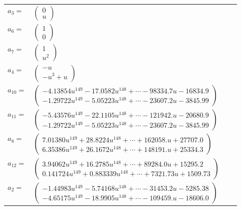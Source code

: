 \documentclass[1p]{elsarticle_modified}
\theoremstyle{definition}
\begin{document}
\begin{tabular}{m{7pt} m{180pt} m{7pt} m{180pt} }
\flushright $a_{3}=$&$\begin{pmatrix}0\\u\end{pmatrix}$ \\
\flushright $a_{6}=$&$\begin{pmatrix}1\\0\end{pmatrix}$ \\
\flushright $a_{7}=$&$\begin{pmatrix}1\\u^2\end{pmatrix}$ \\
\flushright $a_{4}=$&$\begin{pmatrix}- u\\- u^3+u\end{pmatrix}$ \\
\flushright $a_{10}=$&$\begin{pmatrix}-4.13854 u^{149}-17.0582 u^{148}+\cdots-98334.7 u-16834.9\\-1.29722 u^{149}-5.05223 u^{148}+\cdots-23607.2 u-3845.99\end{pmatrix}$ \\
\flushright $a_{11}=$&$\begin{pmatrix}-5.43576 u^{149}-22.1105 u^{148}+\cdots-121942. u-20680.9\\-1.29722 u^{149}-5.05223 u^{148}+\cdots-23607.2 u-3845.99\end{pmatrix}$ \\
\flushright $a_{8}=$&$\begin{pmatrix}7.01380 u^{149}+28.8224 u^{148}+\cdots+162058. u+27707.0\\6.35386 u^{149}+26.1672 u^{148}+\cdots+148191. u+25334.3\end{pmatrix}$ \\
\flushright $a_{12}=$&$\begin{pmatrix}3.94062 u^{149}+16.2785 u^{148}+\cdots+89284.0 u+15295.2\\0.141724 u^{149}+0.883339 u^{148}+\cdots+7321.73 u+1509.73\end{pmatrix}$ \\
\flushright $a_{2}=$&$\begin{pmatrix}-1.44983 u^{149}-5.74168 u^{148}+\cdots-31453.2 u-5285.38\\-4.65175 u^{149}-18.9905 u^{148}+\cdots-109459. u-18606.0\end{pmatrix}$ \\

\end{tabular}
\end{document}
